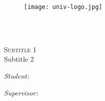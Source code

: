 \documentclass[
12pt, %
english, %
onehalfspacing, %
headsepline, %
]{MastersDoctoralThesis} %
\author{John \textsc{Smith}} %
\begin{document}
\frontmatter %

\pagestyle{plain} %


\begin{titlepage}
  \begin{center}

    \vspace*{.01\textheight}
    {\scshape\LARGE \univname\par}\vspace{0.1cm} %
    {\scshape\LARGE \deptname\par}\vspace{1.0cm} %

    \begin{figure}[h]
      \centering
      \texttt{[image: univ-logo.jpg]}
      \label{fig:logo}
    \end{figure}

    {\scshape\Large \groupname\par}\vspace{1cm} %


    \HRule \\[0.4cm] %
    {\huge \bfseries \ttitle\par}\vspace{0.4cm} %
    \HRule \\[0.8cm] %

    \vspace{0.5cm}
    \textsc{\large Subtitle 1}\\[0.2cm] %
    {\large Subtitle 2}
    \vspace{1.5cm}

    \begin{minipage}[t]{0.4\textwidth}
      \begin{flushleft} \large
        \emph{Student:}\\
        \href{http://www.johnsmith.com}{\authorname} %
      \end{flushleft}
    \end{minipage}
    \begin{minipage}[t]{0.4\textwidth}
      \begin{flushright} \large
        \emph{Supervisor:} \\
        \href{http://www.johnsmith.- name: Dependency Manager for PHP
          composer: working_dir= 
        }{\supname} %
      \end{flushright}
    \end{minipage}\\[3cm]
    

\end{center}
\end{titlepage}
\end{document}
